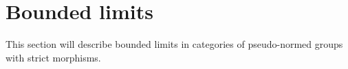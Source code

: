 \section{Bounded limits}

This section will describe bounded limits in categories of pseudo-normed groups with strict morphisms.
